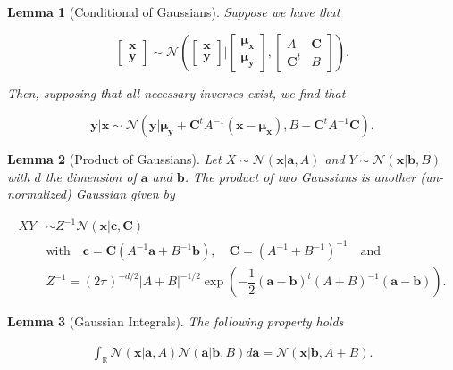 \documentclass[12pt,a4paper,oneside]{book}
\newtheorem{Lemma}{Lemma}
\begin{document}
\begin{Lemma} [Conditional of Gaussians]
Suppose we have that

\begin{equation}
\begin{bmatrix}
    \bm{x}  \\
    \bm{y}
\end{bmatrix}
\sim 
\mathcal{N} \left( \begin{bmatrix}
    \bm{x}  \\
    \bm{y}
\end{bmatrix} \bigg\rvert \begin{bmatrix}
    \bm{\mu_x}  \\
    \bm{\mu_y}
\end{bmatrix}, 
\begin{bmatrix}
    A & \bm{C}\\
    \bm{C}^t  & B
\end{bmatrix} 
\right).
\end{equation} 

Then, supposing that all necessary inverses exist, we find that 

\begin{equation}
\bm{y} | \bm{x} \sim \mathcal{N}(\bm{y} | \bm{\mu_y} + \bm{C}^t A^{-1} (\bm{x} - \bm{\mu_x}), B - \bm{C}^t   A^{-1} \bm{C}).
\end{equation}

\end{Lemma}


\begin{Lemma} [Product of Gaussians]
Let $X \sim \mathcal{N}(\bm{x}|\bm{a},A)$ and $Y \sim \mathcal{N}(\bm{x}|\bm{b},B)$ with $d$ the dimension of $\bm{a}$ and $\bm{b}$. The product of two Gaussians is another (un-normalized) Gaussian given by

\begin{align}
X Y &\sim Z^{-1} \mathcal{N}(\bm{x}|\bm{c},\bm{C}) \\
&  \text{with} \quad \bm{c} = \bm{C}(A^{-1} \bm{a} + B^{-1} \bm{b}) , \quad \bm{C} = (A^{-1} + B^{-1})^{-1} \quad \text{and} \nonumber \\ & Z^{-1} = (2 \pi)^{-d/2} | A + B|^{-1/2} \exp{\left(-\dfrac{1}{2} (\bm{a} - \bm{b} )^t( A +B )^{-1} ( \bm{a} -\bm{b} ) \right)} \nonumber.
\end{align} 
\end{Lemma}

\begin{Lemma}[Gaussian Integrals]\label{appendix_integrals_gaussians} 
The following property holds

\begin{align}
\int_{\mathbb{R}} \mathcal{N}(\bm{x}|\bm{a},A) \mathcal{N}(\bm{a}|\bm{b},B) d\bm{a} = \mathcal{N}(\bm{x}|\bm{b},A +B).
\end{align} 
\end{Lemma}
\end{document}
